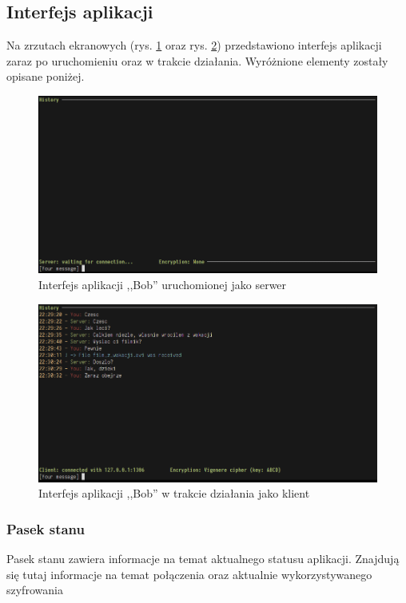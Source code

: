 \documentclass{article}
\begin{document}
  \subsection{Interfejs aplikacji}
    Na zrzutach ekranowych (rys. \ref{SERVER_INTERFACE} oraz rys. \ref{CLIENT_INTERFACE}) przedstawiono interfejs
    aplikacji  zaraz po uruchomieniu oraz w trakcie działania.  Wyróżnione elementy zostały opisane poniżej.
    \begin{figure}[tp]
        \centering
        \includegraphics[scale=0.4]{podstawowy_interfejs_po_uruchomieniu_serwer}
        \caption{Interfejs aplikacji ,,Bob'' uruchomionej jako serwer}
        \label{SERVER_INTERFACE}
    \end{figure}
    \begin{figure}[tp]
        \centering
        \includegraphics[scale=0.4]{interfejs_podczas_dzialania_klient}
        \caption{Interfejs aplikacji ,,Bob'' w trakcie działania jako klient}
        \label{CLIENT_INTERFACE}
    \end{figure}
    \subsubsection{Pasek stanu}
      Pasek stanu zawiera informacje na temat aktualnego statusu aplikacji. Znajdują się tutaj informacje na temat
      połączenia oraz aktualnie wykorzystywanego szyfrowania
\end{document}
